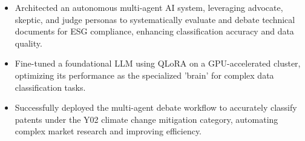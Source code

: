 \documentclass[10pt, letterpaper]{article}
\begin{document}
\begin{itemize}[leftmargin=0.15in, topsep=0pt, partopsep=0pt, itemsep=-2pt]
    \item Architected an autonomous multi-agent AI system, leveraging advocate, skeptic, and judge personas to systematically evaluate and debate technical documents for ESG compliance, enhancing classification accuracy and data quality.
    \item Fine-tuned a foundational LLM using QLoRA on a GPU-accelerated cluster, optimizing its performance as the specialized 'brain' for complex data classification tasks.
    \item Successfully deployed the multi-agent debate workflow to accurately classify patents under the Y02 climate change mitigation category, automating complex market research and improving efficiency.
\end{itemize}
\vspace{4pt}


\end{document}
